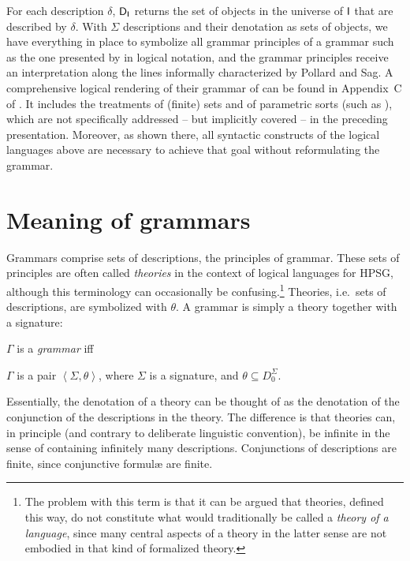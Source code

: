 \documentclass[output=paper
 	        ,biblatex
                ,babelshorthands
                ,newtxmath
                ,draftmode
                ,colorlinks, citecolor=brown
]{langscibook}
\begin{document}
{For each description $\delta$, $\mathsf{D}_{\mathsf{I}}$ returns the set of
objects in the universe of $\mathsf{I}$ that are described by
$\delta$. With $\Sigma$ descriptions and their denotation as sets of
objects, we have everything in place to symbolize all grammar
principles of a grammar such as the one presented by
\citet{PollardSag1994} in logical notation, and the grammar principles
receive an interpretation along the lines
informally characterized by Pollard and Sag. A comprehensive logical
rendering of their grammar of  can be found in Appendix~C of
\citet{Richter2004a-u}. It includes the treatments of (finite) sets
and of parametric sorts (such as ), which are not
specifically addressed -- but implicitly covered -- in
the preceding presentation. Moreover, as shown there, all syntactic
constructs of the logical languages above are necessary to achieve
that goal without reformulating the grammar.



\section{Meaning of grammars}
\label{sec-grammar-meaning}

Grammars comprise sets of descriptions, the principles of grammar. These sets of
principles are often called \emph{theories} in the context of
logical languages for HPSG, although this terminology can occasionally
be confusing.\footnote{The problem with this term is that
  it can be argued that theories, defined this way, do not constitute what would
  traditionally be called a \emph{theory of a language}, since many central
  aspects of a theory in the latter sense are not embodied in that kind
  of formalized theory.} Theories, i.e.\ sets of descriptions, are
symbolized with $\theta$.  A grammar is simply a theory together with a
signature:

\begin{mydef}\label{def-grammar}
  $\Gamma$ is a \emph{grammar} iff
  
$\Gamma$ is a pair
\( \left<\Sigma, \theta \right>\), where
$\Sigma$ is a signature, and
$\theta \subseteq D_0^{\Sigma}$.
\end{mydef}

Essentially, the denotation of a theory can be thought of as
the denotation of the conjunction of the descriptions in the theory.
The difference is
that theories can, in principle (and contrary to deliberate linguistic
convention), be infinite in the sense of containing infinitely many
descriptions. Conjunctions of descriptions are finite, since conjunctive
formulæ are finite.

}
\end{document}
